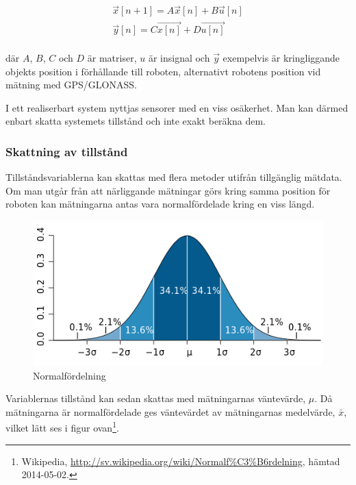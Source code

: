 \documentclass[a4paper,12pt,fleqn]{article}
\begin{document}
\begin{gather}
\vec{x}[n+1] = A\vec{x}[n] + B\vec{u}[n] \\
\vec{y}[n] = C\vec{x[n]} + D\vec{u[n]}
\end{gather}
\\
där $A$, $B$, $C$ och $D$ är matriser, $u$ är insignal och $\vec{y}$ exempelvis är kringliggande objekts position i förhållande till roboten, alternativt robotens position vid mätning med GPS/GLONASS. 

I ett realiserbart system nyttjas sensorer med en viss osäkerhet. Man kan därmed enbart skatta systemets tillstånd och inte exakt beräkna dem. 

\subsubsection{Skattning av tillstånd}

Tillståndsvariablerna kan skattas med flera metoder utifrån tillgänglig mätdata. Om man utgår från att närliggande mätningar görs kring samma position för roboten kan mätningarna antas vara normalfördelade kring en viss längd. 

\begin{figure}[htp] %
  \begin{center}
  \includegraphics[keepaspectratio=true,scale=0.5]{normalfordelning.png}  %
  \end{center}
  \caption{Normalfördelning} %
  \label{fig:fire} %
\end{figure}

Variablernas tillstånd kan sedan skattas med mätningarnas väntevärde, $\mu$. Då mätningarna är normalfördelade ges väntevärdet av mätningarnas medelvärde, $\bar{x}$, vilket lätt ses i figur ovan\footnote{Wikipedia, \url{http://sv.wikipedia.org/wiki/Normalf\%C3\%B6rdelning}, hämtad 2014-05-02.}. 
\end{document}
